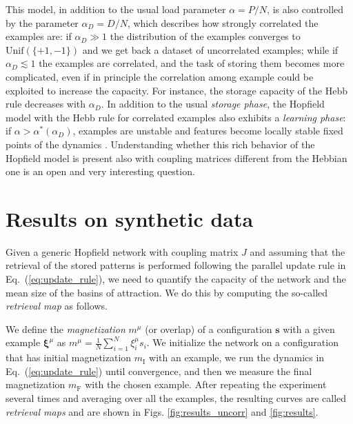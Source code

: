 \documentclass[a4paper]{cas-sc}
\newcommand{\bxi}{\boldsymbol{\xi}}
\newcommand{\bs}{\boldsymbol{s}}
\begin{document}
This model, in addition to the usual load parameter $\alpha=P/N$, is also controlled by the parameter $\alpha_D=D/N$, which describes how strongly correlated the examples are: if $\alpha_D \gg 1$ the distribution of the examples converges to $\mathrm{Unif}(\{+1,-1\})$ and we get back a dataset of uncorrelated examples; while if $\alpha_D \lesssim 1$ the examples are correlated, and the task of storing them becomes more complicated, even if in principle the correlation among example could be exploited to increase the capacity. For instance, the storage capacity of the Hebb rule decreases with $\alpha_D$. In addition to the usual \emph{storage phase}, the Hopfield model with the Hebb rule for correlated examples also exhibits a \emph{learning phase}: if $\alpha > \alpha^*(\alpha_D)$, examples are unstable and features become locally stable fixed points of the dynamics  \cite{negri2023storage}.
Understanding whether this rich behavior of the Hopfield model is present also with coupling matrices different from the Hebbian one is an open and very interesting question.

\section{Results on synthetic data}
\label{sec:results_synt}

Given a generic Hopfield network with coupling matrix $J$ and assuming that the retrieval of the stored patterns is performed following the parallel update rule in Eq.~(\ref{eq:update_rule}), we need to quantify the capacity of the network and the mean size of the basins of attraction. We do this by computing the so-called \emph{retrieval map} as follows.

We  define the \emph{magnetization} $m^\mu$ (or overlap) of a configuration $\bs$ with a given example $\bxi^\mu$ as $m^\mu=\frac{1}{N} \sum_{i=1}^N \xi_i^\mu s_i$.
We initialize the network on a configuration that has initial magnetization $m_\mathrm{I}$ with an example, we run the dynamics in Eq.~(\ref{eq:update_rule}) until convergence, and then we measure the final magnetization $m_\mathrm{F}$ with the chosen example.
After repeating the experiment several times and averaging over all the examples, the resulting curves are called \emph{retrieval maps} and are shown in Figs. \ref{fig:results_uncorr} and \ref{fig:results}.
\end{document}
